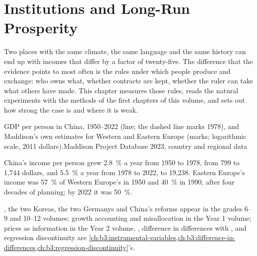 \chapter{Institutions and Long-Run Prosperity}\label{ch:b3:institutions}

Two places with the same climate, the same language and the same history can end up
with incomes that differ by a factor of twenty-five. The difference that the evidence
points to most often is the rules under which people produce and exchange: who owns
what, whether contracts are kept, whether the ruler can take what others have made.
This chapter measures those rules, reads the natural experiments with the methods of
the first chapters of this volume, and sets out how strong the case is and where it
is weak.

\begin{openingchart}{GDP per person in China, 1950--2022 (line; the dashed line marks 1978), and Maddison's own estimates for Western and Eastern Europe (marks;
logarithmic scale, 2011 dollars).}{Maddison Project Database 2023, country and regional
data}
\end{openingchart}

China's income per person grew 2.8~\% a year from 1950 to 1978, from 799 to 1{,}744 dollars, and 5.5~\% a year from
1978 to 2022, to 19{,}238. Eastern Europe's income was 57~\% of Western Europe's in 1950 and 40~\% in 1990, after four
decades of planning; by 2022 it was 50~\%.

\begin{recall}
, the two Koreas, the two Germanys and China's reforms appear in the
grades 6--9 and 10--12 volumes; growth accounting and misallocation in the Year 1
volume; prices as information in the Year 2 volume. ,
difference in differences with , and regression discontinuity are
\cref{ch:b3:instrumental-variables,ch:b3:difference-in-differences,ch:b3:regression-discontinuity}'s.
\end{recall}

